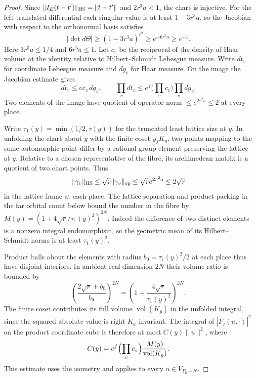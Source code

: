 \begin{proof}
Since \(\|I_E(t-t')\|_{\rm HS}=\|t-t'\|\)
and \(2r^3a<1\), the chart is injective. For the
left-translated differential each singular value is at least
\(1-3r^3a\), so the Jacobian with respect to the orthonormal basis satisfies
\[
 |\det d\Theta|\ge(1-3r^3a)^{r^2}\ge e^{-6r^5a}\ge e^{-1}.
\]
Here \(3r^3a\le1/4\) and \(6r^5a\le1\).
Let \(c_v\) be the reciprocal of the density of Haar volume at the
identity relative to Hilbert--Schmidt Lebesgue measure. Write \(dt_v\) for coordinate Lebesgue measure and \(dg_v\) for
Haar measure. On the image the Jacobian estimate gives
\[
 dt_v\le e c_v\,dg_v,\qquad
 \prod_v dt_v\le e^f\Big(\prod_v c_v\Big)\prod_v dg_v .
\] Two elements of the image
have quotient of operator norm \(\le e^{2r^2 a}\le 2\) at every place.


Write \(\tau_1(y)=\min(1/2,\tau(y))\) for the truncated least
lattice size at \(y\). In unfolding the chart about \(y\) with the
finite coset \(y_fK_g\), two points mapping to the same automorphic
point differ by a rational group element preserving the lattice at
\(y\). Relative to a chosen representative of the fibre, its
archimedean matrix is a quotient of two chart points. Thus
\[
 \|\gamma_v\|_{\rm HS}\le\sqrt r\|\gamma_v\|_{\rm op}
     \le\sqrt r e^{2r^2a}\le2\sqrt r
\]
in the lattice frame at each place.
The lattice separation and product packing in the far orbital count
below bound the number in the fibre by
\(M(y)=(1+4\sqrt r/\tau_1(y)^2)^{2N}\).
Indeed the difference of two distinct elements is a nonzero integral
endomorphism, so the geometric mean of its Hilbert--Schmidt norms
is at least \(\tau_1(y)^2\).

Product balls about the elements with
radius \(b_0=\tau_1(y)^2/2\) at each place thus have disjoint interiors.
In ambient real dimension \(2N\) their volume ratio is bounded by
\[
 \left(\frac{2\sqrt r+b_0}{b_0}\right)^{2N}
     =\left(1+\frac{4\sqrt r}{\tau_1(y)^2}\right)^{2N}.
\] The finite coset contributes its full
volume \(\operatorname{vol}(K_g)\) in the unfolded integral, since
the squared absolute value is right \(K_g\)-invariant. The integral
of \(|F_j(u,\cdot)|^2\) on the product coordinate cube is therefore
at most \(C(y)\|u\|^2\), where
\begin{equation}\label{eq:gram-chart-multiplicity}
 C(y)=e^f\Bigl(\prod_v c_v\Bigr)\frac{M(y)}{\operatorname{vol}(K_g)} .
\end{equation}
This estimate uses the isometry and applies to every
\(u\in V_{P_0+N}\).


\end{proof}
